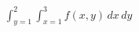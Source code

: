 \documentclass[preview]{standalone}
\begin{document}
\begin{align*}
\int_{y=1}^2 \int_{x=1}^3 f(x,y)\,dx\,dy
\end{align*}
\end{document}
